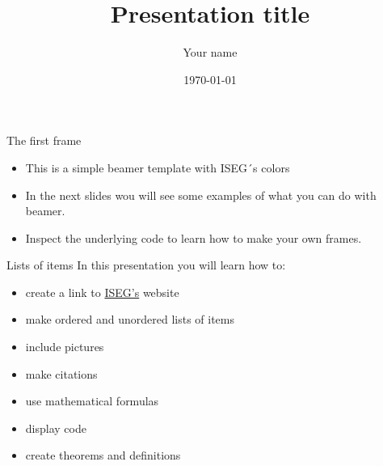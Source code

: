 


\title[Presentation title]{Presentation title}

\author[Your name]{Your name}

\date{\today}






\begin{frame}{The first frame}
	\begin{itemize}
		\item This is a simple beamer template with ISEG´s colors
		\item In the next slides wou will see some examples of what you can do with beamer.
		\item Inspect the underlying code to learn how to make your own frames.
	\end{itemize}
\end{frame}

\begin{frame}{Lists of items}
	In this presentation you will learn how to:
	\begin{itemize}
	\item create a link to  \href{https://www.iseg.ulisboa.pt/aquila/instituicao/ISEG/}{ISEG's} website
	\item make ordered and unordered lists of items
	\item include pictures
	\item make citations
	\item use mathematical formulas
	\item display code
	\item create theorems and definitions
	\end{itemize}
\end{frame}

